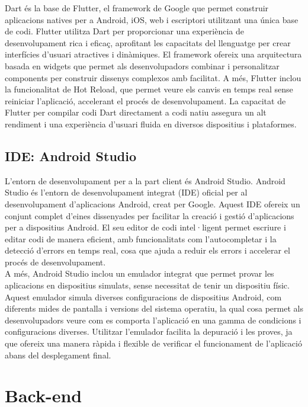 \documentclass[a4paper,12pt,twoside]{ThesisStyle}
\begin{document}
Dart és la base de Flutter, el framework de Google que permet construir aplicacions natives per a Android, iOS, web i escriptori utilitzant una única base de codi. Flutter utilitza Dart per proporcionar una experiència de desenvolupament rica i eficaç, aprofitant les capacitats del llenguatge per crear interfícies d'usuari atractives i dinàmiques. El framework ofereix una arquitectura basada en widgets que permet als desenvolupadors combinar i personalitzar components per construir dissenys complexos amb facilitat. A més, Flutter inclou la funcionalitat de Hot Reload, que permet veure els canvis en temps real sense reiniciar l'aplicació, accelerant el procés de desenvolupament. La capacitat de Flutter per compilar codi Dart directament a codi natiu assegura un alt rendiment i una experiència d'usuari fluida en diversos dispositius i plataformes.



\subsection{IDE: Android Studio}
\label{subsec:IDE: Android Studio}
L'entorn de desenvolupament per a la part client és Android Studio. Android Studio és l'entorn de desenvolupament integrat (IDE) oficial per al desenvolupament d'aplicacions Android, creat per Google. Aquest IDE ofereix un conjunt complet d'eines dissenyades per facilitar la creació i gestió d'aplicacions per a dispositius Android. El seu editor de codi intel·ligent permet escriure i editar codi de manera eficient, amb funcionalitats com l'autocompletar i la detecció d'errors en temps real, cosa que ajuda a reduir els errors i accelerar el procés de desenvolupament.\\

A més, Android Studio inclou un emulador integrat que permet provar les aplicacions en dispositius simulats, sense necessitat de tenir un dispositiu físic. Aquest emulador simula diverses configuracions de dispositius Android, com diferents mides de pantalla i versions del sistema operatiu, la qual cosa permet als desenvolupadors veure com es comporta l'aplicació en una gamma de condicions i configuracions diverses. Utilitzar l'emulador facilita la depuració i les proves, ja que ofereix una manera ràpida i flexible de verificar el funcionament de l'aplicació abans del desplegament final.



\section{Back-end}
\label{sec: Back-end}
\end{document}
